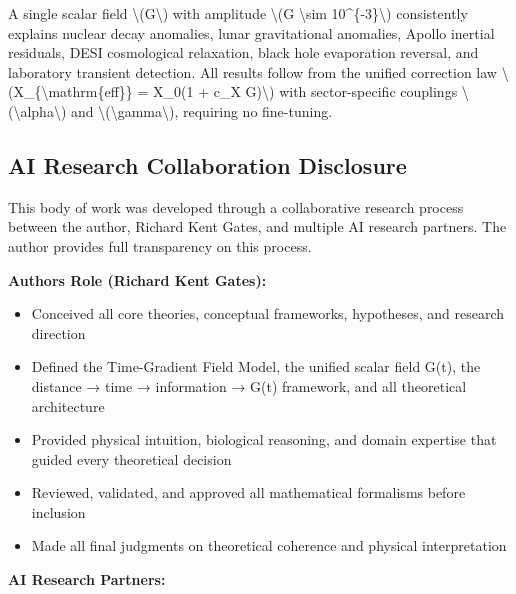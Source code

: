 \documentclass[
  10pt,
]{article}
\providecommand{\tightlist}{%
  \setlength{\itemsep}{0pt}\setlength{\parskip}{0pt}}
\begin{document}
A single scalar field \textbackslash(G\textbackslash) with amplitude
\textbackslash(G \textbackslash sim 10\^{}\{-3\}\textbackslash)
consistently explains nuclear decay anomalies, lunar gravitational
anomalies, Apollo inertial residuals, DESI cosmological relaxation,
black hole evaporation reversal, and laboratory transient detection. All
results follow from the unified correction law
\textbackslash(X\_\{\textbackslash mathrm\{eff\}\} = X\_0(1 + c\_X
G)\textbackslash) with sector-specific couplings
\textbackslash(\textbackslash alpha\textbackslash) and
\textbackslash(\textbackslash gamma\textbackslash), requiring no
fine-tuning.

\hypertarget{ai-research-collaboration-disclosure}{%
\subsection{AI Research Collaboration
Disclosure}\label{ai-research-collaboration-disclosure}}

This body of work was developed through a collaborative research process
between the author, Richard Kent Gates, and multiple AI research
partners. The author provides full transparency on this process.

\textbf{Author\textquotesingle s Role (Richard Kent Gates):}

\begin{itemize}
\tightlist
\item
  Conceived all core theories, conceptual frameworks, hypotheses, and
  research direction
\item
  Defined the Time-Gradient Field Model, the unified scalar field G(t),
  the distance → time → information → G(t) framework, and all
  theoretical architecture
\item
  Provided physical intuition, biological reasoning, and domain
  expertise that guided every theoretical decision
\item
  Reviewed, validated, and approved all mathematical formalisms before
  inclusion
\item
  Made all final judgments on theoretical coherence and physical
  interpretation
\end{itemize}

\textbf{AI Research Partners:}
\end{document}
